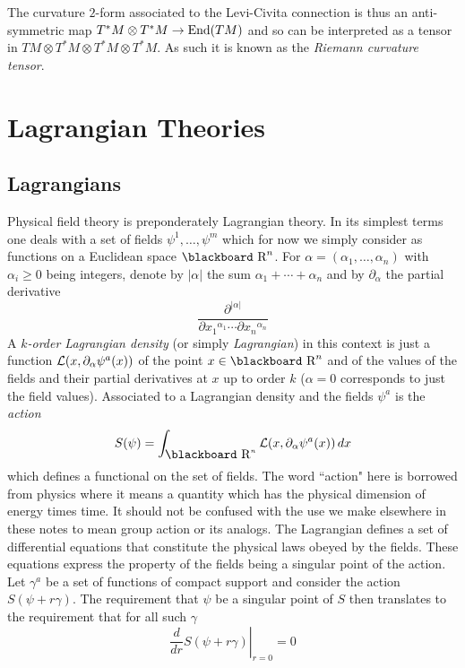 \documentclass[12pt,titlepage]{article}
\def\bbf#1{\hbox{\blackboard #1}}
\def\lR{\bbf R}
\def\cL{{\cal L}}
\def\End{\hbox{End}}
\begin{document}
The curvature \(2\)-form associated to the Levi-Civita connection is thus 
an anti-symmetric map \(T^*M\otimes T^*M \to \End(TM)\) and so can be 
interpreted as a tensor in \(TM\otimes T^*M\otimes T^*M \otimes T^*M \). As 
such it is known as  
the {\em Riemann curvature tensor\/}.
%

\section{Lagrangian Theories}%
\subsection{Lagrangians}\label{sec:lagrange}%
Physical field theory is preponderately
Lagrangian theory. In its simplest terms one deals with a set of
fields \(\psi^1,\dots,\psi^m\) which for now we simply consider as
functions on a Euclidean space \(\lR^n\). For 
\(\alpha=(\alpha_1,\dots,\alpha_n)\) with \(\alpha_i\ge 0\) being
integers, denote by \(|\alpha|\) the sum 
\(\alpha_1+\cdots+\alpha_n\) and by \(\partial_\alpha\) 
the partial derivative
\[
\frac{\partial^{|\alpha|}}
{\partial x_1{}^{\alpha_1}\cdots \partial x_n{}^{\alpha_n}}
\]
 A {\em \(k\)-order Lagrangian density\/}
%
% 
(or simply {\em Lagrangian\/}) in this
context is
just a function
\(\cL(x,\partial_\alpha\psi^a(x))\) of the point
\(x\in \lR^n\) and of the values of the fields and their partial
derivatives at \(x\) up to order \(k\) (\(\alpha=0\) corresponds to
just the field values). 
Associated to a Lagrangian  density and the fields
\(\psi^a\) is the {\em action\/}
%
\begin{equation}\label{eq:action}%
S(\psi) = \int_{\lR^n} \cL(x,\partial_\alpha\psi^a(x))\,dx
\end{equation}%
which defines a functional on the set of fields.
The word ``action" here is borrowed from  physics where it means a quantity
which has the physical dimension of energy times time. It should not be
confused with the use we make elsewhere in these notes to mean group
action or its analogs.
The Lagrangian defines a set of differential equations that constitute
the physical laws obeyed  by the fields. These equations express the
property of the fields being a singular point of the action.  Let
\(\gamma^a\) be a set of functions of compact support and consider the
action \(S(\psi+r\gamma)\). The requirement that \(\psi\) be a singular
point of \(S\) then translates to the requirement that for all such 
\(\gamma\)
\[%
\left.\frac{d}{dr}S(\psi+r\gamma)\right|_{r=0} = 0
\]
\end{document}
